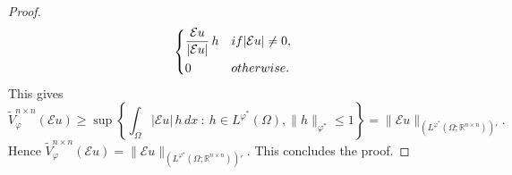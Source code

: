 \documentclass[10pt,a4paper]{amsart}
\def\R{\mathbb{R}}
\newcommand{\E}{\mathcal{E}}
\newcommand{\st}{ \ : \ }
\newcommand{\vphi}{\varphi}
\begin{document}
\begin{proof}
\begin{equation*}
        \begin{dcases}
            \frac{\mathcal E u}{|\mathcal E u|} \, h & \textnormal{ if } |\mathcal E u|\neq 0, \\
            0 & \textnormal{ otherwise.}
        \end{dcases}
    \end{equation*}
    This gives 
    \begin{equation*}
        \widetilde{V}^{n \times n}_\vphi( \E u) \ge \sup \left\{ \int_\Omega |\E u| \, h \, dx \st h \in L^{\vphi^*}(\Omega), \| h\|_{\vphi^*}\le 1 \right\} = \| \E u \|_{(L^{\vphi^*}(\Omega;\R^{n \times n}))'}.
    \end{equation*}
    Hence $\widetilde{V}^{n \times n}_\vphi(\E u) = \| \E u \|_{(L^{\vphi^*}(\Omega;\R^{n \times n}))'}$. This concludes the proof.
\end{proof}
\end{document}
